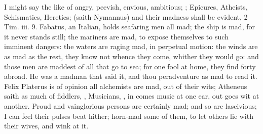 {I might say the like of angry, peevish, envious, ambitious; 
; Epicures, Atheists, Schismatics,
Heretics;  (saith Nymannus) and
their madness shall be evident, 2 Tim. iii. 9. Fabatus, an
Italian, holds seafaring men all mad; the ship is mad, for it never
stands still; the mariners are mad, to expose themselves to such
imminent dangers: the waters are raging mad, in perpetual motion: the
winds are as mad as the rest, they know not whence they come, whither
they would go: and those men are maddest of all that go to sea; for one
fool at home, they find forty abroad. He was a madman that said it, and
thou peradventure as mad to read it.  Felix Platerus is of opinion
all alchemists are mad, out of their wits; Atheneus saith as much
of fiddlers, ,  Musicians, , in comes music at one
ear, out goes wit at another. Proud and vainglorious persons are
certainly mad; and so are lascivious; I can feel their pulses beat
hither; horn-mad some of them, to let others lie with their wives, and
wink at it.

}
